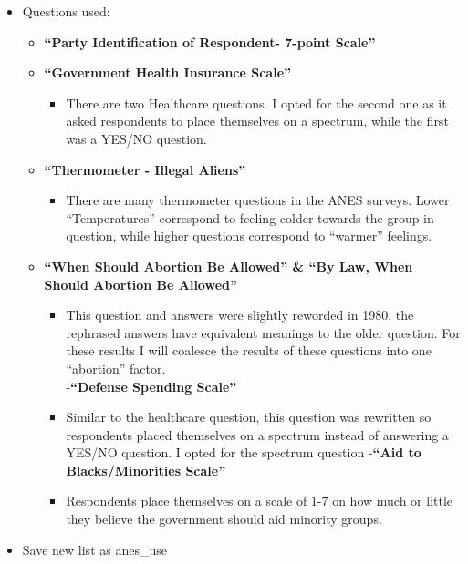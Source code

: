 \documentclass[
]{article}
\providecommand{\tightlist}{%
  \setlength{\itemsep}{0pt}\setlength{\parskip}{0pt}}
\begin{document}
\begin{itemize}
\tightlist
\item
  Questions used:

  \begin{itemize}
  \tightlist
  \item
    \textbf{``Party Identification of Respondent- 7-point Scale''}
  \item
    \textbf{``Government Health Insurance Scale''}

    \begin{itemize}
    \tightlist
    \item
      There are two Healthcare questions. I opted for the second one as
      it asked respondents to place themselves on a spectrum, while the
      first was a YES/NO question.
    \end{itemize}
  \item
    \textbf{``Thermometer - Illegal Aliens''}

    \begin{itemize}
    \tightlist
    \item
      There are many thermometer questions in the ANES surveys. Lower
      ``Temperatures'' correspond to feeling colder towards the group in
      question, while higher questions correspond to ``warmer''
      feelings.
    \end{itemize}
  \item
    \textbf{``When Should Abortion Be Allowed'' \& ``By Law, When Should
    Abortion Be Allowed''}

    \begin{itemize}
    \tightlist
    \item
      This question and answers were slightly reworded in 1980, the
      rephrased answers have equivalent meanings to the older question.
      For these results I will coalesce the results of these questions
      into one ``abortion'' factor.\\
      -\textbf{``Defense Spending Scale''}
    \item
      Similar to the healthcare question, this question was rewritten so
      respondents placed themselves on a spectrum instead of answering a
      YES/NO question. I opted for the spectrum question -\textbf{``Aid
      to Blacks/Minorities Scale''}
    \item
      Respondents place themselves on a scale of 1-7 on how much or
      little they believe the government should aid minority groups.
    \end{itemize}
  \end{itemize}
\item
  Save new list as anes\_use
\end{itemize}
\end{document}
